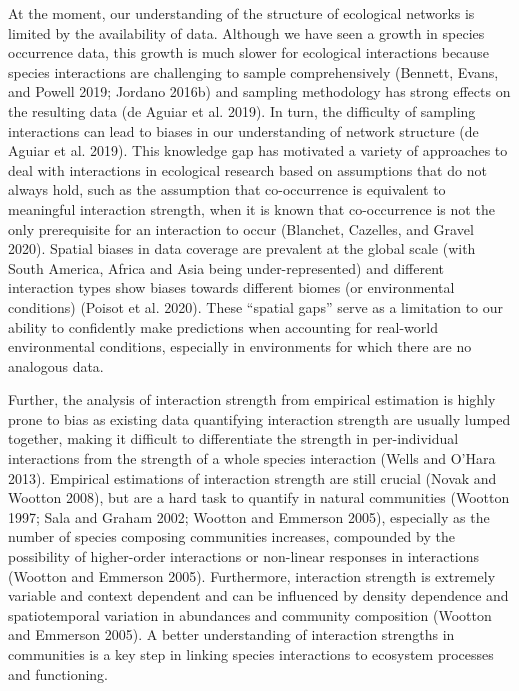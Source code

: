\documentclass[11pt]{article}
\begin{document}
At the moment, our understanding of the structure of ecological networks
is limited by the availability of data. Although we have seen a growth
in species occurrence data, this growth is much slower for ecological
interactions because species interactions are challenging to sample
comprehensively (Bennett, Evans, and Powell 2019; Jordano 2016b) and
sampling methodology has strong effects on the resulting data (de Aguiar
et al. 2019). In turn, the difficulty of sampling interactions can lead
to biases in our understanding of network structure (de Aguiar et al.
2019). This knowledge gap has motivated a variety of approaches to deal
with interactions in ecological research based on assumptions that do
not always hold, such as the assumption that co-occurrence is equivalent
to meaningful interaction strength, when it is known that co-occurrence
is not the only prerequisite for an interaction to occur (Blanchet,
Cazelles, and Gravel 2020). Spatial biases in data coverage are
prevalent at the global scale (with South America, Africa and Asia being
under-represented) and different interaction types show biases towards
different biomes (or environmental conditions) (Poisot et al. 2020).
These ``spatial gaps'' serve as a limitation to our ability to
confidently make predictions when accounting for real-world
environmental conditions, especially in environments for which there are
no analogous data.

Further, the analysis of interaction strength from empirical estimation
is highly prone to bias as existing data quantifying interaction
strength are usually lumped together, making it difficult to
differentiate the strength in per-individual interactions from the
strength of a whole species interaction (Wells and O'Hara 2013).
Empirical estimations of interaction strength are still crucial (Novak
and Wootton 2008), but are a hard task to quantify in natural
communities (Wootton 1997; Sala and Graham 2002; Wootton and Emmerson
2005), especially as the number of species composing communities
increases, compounded by the possibility of higher-order interactions or
non-linear responses in interactions (Wootton and Emmerson 2005).
Furthermore, interaction strength is extremely variable and context
dependent and can be influenced by density dependence and spatiotemporal
variation in abundances and community composition (Wootton and Emmerson
2005). A better understanding of interaction strengths in communities is
a key step in linking species interactions to ecosystem processes and
functioning.
\end{document}
